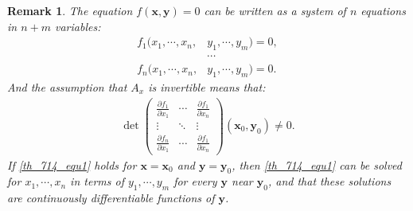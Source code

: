 \documentclass[10pt]{book}
\newtheorem{remark}{Remark}[chapter]
\theoremstyle{definition}
\numberwithin{equation}{chapter}
\begin{document}
\begin{remark}
The equation $f(\mathbf{x},\mathbf{y}) = 0$ can be written as a system of $n$ equations in $n + m$ variables:
\begin{align*}
    f_1(x_1, \cdots, x_n, & y_1, \cdots, y_m) = 0, \\
    & \cdots \\
    f_n(x_1, \cdots, x_n, & y_1, \cdots, y_m) = 0.
\end{align*}
And the assumption that $A_x$ is invertible means that:
\begin{align*}
    \det \begin{pmatrix}
        \frac{\partial f_1}{\partial x_1} & \cdots & \frac{\partial f_1}{\partial x_n} \\
        \vdots & \ddots & \vdots \\
        \frac{\partial f_n}{\partial x_1} & \cdots & \frac{\partial f_1}{\partial x_n}
    \end{pmatrix}(\mathbf{x}_0,\mathbf{y}_0) \neq 0.
\end{align*}
If \eqref{th_714_equ1} holds for $\mathbf{x} = \mathbf{x}_0$ and $\mathbf{y} = \mathbf{y}_0$, then \eqref{th_714_equ1} can be solved for $x_1, \cdots, x_n$ in terms of $y_1, \cdots, y_m$ for every $\mathbf{y}$ near $\mathbf{y}_0$, and that these solutions are continuously differentiable functions of $\mathbf{y}$.
\end{remark}
\end{document}

